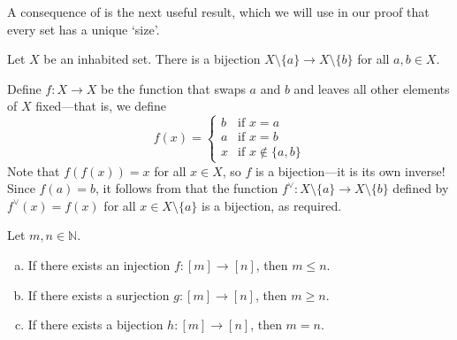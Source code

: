 A consequence of  is the next useful result, which we will use in our proof that every set has a unique `size'.

\begin{lemma}
\label{lemRemoveElementFromSet}
Let $X$ be an inhabited set. There is a bijection $X \setminus \{ a \} \to X \setminus \{ b \}$ for all $a, b \in X$.
\end{lemma}

\begin{cproof}
Define $f : X \to X$ be the function that swaps $a$ and $b$ and leaves all other elements of $X$ fixed---that is, we define
\[ f(x) = \begin{cases} b & \text{if } x = a \\ a & \text{if } x = b \\ x & \text{if } x \not\in \{ a, b \} \end{cases} \]
Note that $f(f(x)) = x$ for all $x \in X$, so $f$ is a bijection---it is its own inverse! Since $f(a) = b$, it follows from  that the function $f^{\vee} : X \setminus \{ a \} \to X \setminus \{ b \}$ defined by $f^{\vee}(x) = f(x)$ for all $x \in X \setminus \{ a \}$ is a bijection, as required.
\end{cproof}

\begin{theorem}
\label{thmJectionsAndSizeOfNaturalNumbers}
Let $m,n \in \mathbb{N}$.
\begin{enumerate}[(a)]
\item If there exists an injection $f : [m] \to [n]$, then $m \le n$.
\item If there exists a surjection $g : [m] \to [n]$, then $m \ge n$.
\item If there exists a bijection $h : [m] \to [n]$, then $m=n$.
\end{enumerate}
\end{theorem}

